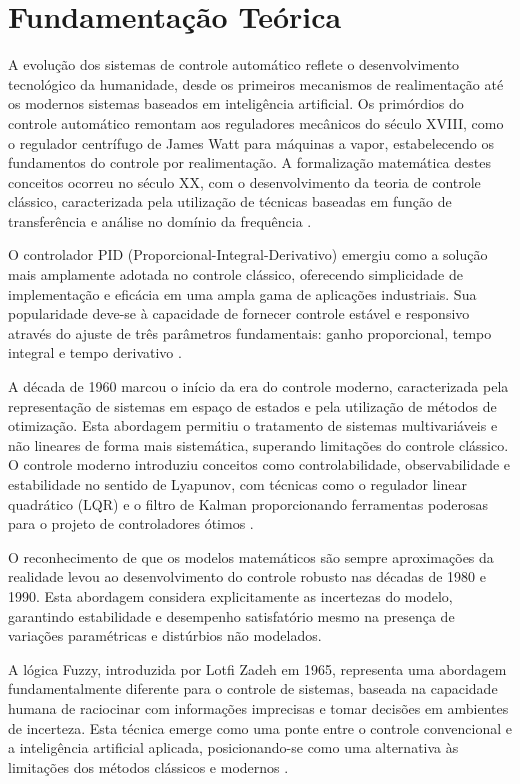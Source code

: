 \chapter{Fundamentação Teórica}
\label{cap:rev.teorica}
\graphicspath{{./Cap2_Revisao_Teorica/Figures/}}

A evolução dos sistemas de controle automático reflete o desenvolvimento tecnológico da humanidade, desde os primeiros mecanismos de realimentação até os modernos sistemas baseados em inteligência artificial. Os primórdios do controle automático remontam aos reguladores mecânicos do século XVIII, como o regulador centrífugo de James Watt para máquinas a vapor, estabelecendo os fundamentos do controle por realimentação. A formalização matemática destes conceitos ocorreu no século XX, com o desenvolvimento da teoria de controle clássico, caracterizada pela utilização de técnicas baseadas em função de transferência e análise no domínio da frequência \cite{ogata2009}.

O controlador PID (Proporcional-Integral-Derivativo) emergiu como a solução mais amplamente adotada no controle clássico, oferecendo simplicidade de implementação e eficácia em uma ampla gama de aplicações industriais. Sua popularidade deve-se à capacidade de fornecer controle estável e responsivo através do ajuste de três parâmetros fundamentais: ganho proporcional, tempo integral e tempo derivativo \cite{villaca2013}.

A década de 1960 marcou o início da era do controle moderno, caracterizada pela representação de sistemas em espaço de estados e pela utilização de métodos de otimização. Esta abordagem permitiu o tratamento de sistemas multivariáveis e não lineares de forma mais sistemática, superando limitações do controle clássico. O controle moderno introduziu conceitos como controlabilidade, observabilidade e estabilidade no sentido de Lyapunov, com técnicas como o regulador linear quadrático (LQR) e o filtro de Kalman proporcionando ferramentas poderosas para o projeto de controladores ótimos \cite{franklin2015}.

O reconhecimento de que os modelos matemáticos são sempre aproximações da realidade levou ao desenvolvimento do controle robusto nas décadas de 1980 e 1990. Esta abordagem considera explicitamente as incertezas do modelo, garantindo estabilidade e desempenho satisfatório mesmo na presença de variações paramétricas e distúrbios não modelados.

A lógica Fuzzy, introduzida por Lotfi Zadeh em 1965, representa uma abordagem fundamentalmente diferente para o controle de sistemas, baseada na capacidade humana de raciocinar com informações imprecisas e tomar decisões em ambientes de incerteza. Esta técnica emerge como uma ponte entre o controle convencional e a inteligência artificial aplicada, posicionando-se como uma alternativa às limitações dos métodos clássicos e modernos \cite{zadeh1965}.

